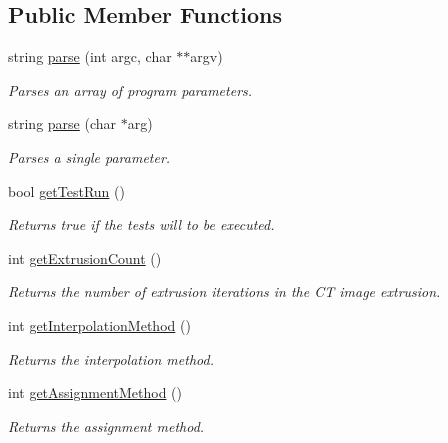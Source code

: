 \subsection*{Public Member Functions}
\begin{DoxyCompactItemize}
\item 
string \hyperlink{classcommand_1_1_parameter_parser_a746a12b36f0881225c568f0b23bf815b}{parse} (int argc, char $\ast$$\ast$argv)
\begin{DoxyCompactList}\small\item\em Parses an array of program parameters. \item\end{DoxyCompactList}\item 
string \hyperlink{classcommand_1_1_parameter_parser_ae9cc20f77e2e0cb841d9f332604818ea}{parse} (char $\ast$arg)
\begin{DoxyCompactList}\small\item\em Parses a single parameter. \item\end{DoxyCompactList}\item 
bool \hyperlink{classcommand_1_1_parameter_parser_a0157d4dc3d92e25713da3d8a1855ce13}{getTestRun} ()
\begin{DoxyCompactList}\small\item\em Returns true if the tests will to be executed. \item\end{DoxyCompactList}\item 
int \hyperlink{classcommand_1_1_parameter_parser_a616ed93ea17dcae575e95684c461361c}{getExtrusionCount} ()
\begin{DoxyCompactList}\small\item\em Returns the number of extrusion iterations in the CT image extrusion. \item\end{DoxyCompactList}\item 
int \hyperlink{classcommand_1_1_parameter_parser_a391f0a5a9172660d42ab0aa0335aa7a3}{getInterpolationMethod} ()
\begin{DoxyCompactList}\small\item\em Returns the interpolation method. \item\end{DoxyCompactList}\item 
int \hyperlink{classcommand_1_1_parameter_parser_a1537acdf02c84c8d72d1bd7c48a491fc}{getAssignmentMethod} ()
\begin{DoxyCompactList}\small\item\em Returns the assignment method. \item\end{DoxyCompactList}\item 
$$
\end{DoxyCompactItemize}
